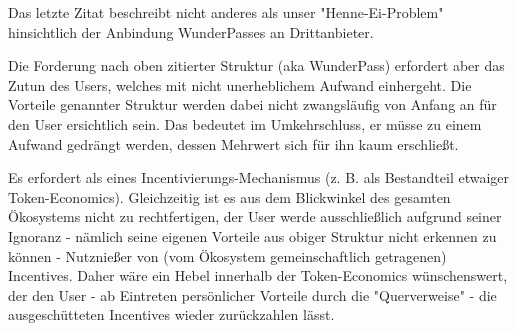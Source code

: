 \vspace{0.3cm}


\begin{Fazit}

Das letzte Zitat beschreibt nicht anderes als unser "Henne-Ei-Problem" hinsichtlich der Anbindung WunderPasses an Drittanbieter.

\end{Fazit}

\vspace{0.3cm}


\begin{Fazit}

Die Forderung nach oben zitierter Struktur (aka WunderPass) erfordert aber das Zutun des Users, welches mit nicht unerheblichem Aufwand einhergeht. Die Vorteile genannter Struktur werden dabei nicht zwangsläufig von Anfang an für den User ersichtlich sein. Das bedeutet im Umkehrschluss, er müsse zu einem Aufwand gedrängt werden, dessen Mehrwert sich für ihn kaum erschließt.

Es erfordert als eines Incentivierungs-Mechanismus (z. B. als Bestandteil etwaiger Token-Economics). Gleichzeitig ist es aus dem Blickwinkel des gesamten Ökosystems nicht zu rechtfertigen, der User werde ausschließlich aufgrund seiner Ignoranz - nämlich seine eigenen Vorteile aus obiger Struktur nicht erkennen zu können - Nutznießer von (vom Ökosystem gemeinschaftlich getragenen) Incentives. Daher wäre ein Hebel innerhalb der Token-Economics wünschenswert, der den User - ab Eintreten persönlicher Vorteile durch die "Querverweise" - die ausgeschütteten Incentives wieder zurückzahlen lässt.
 

\end{Fazit}

\vspace{0.3cm}